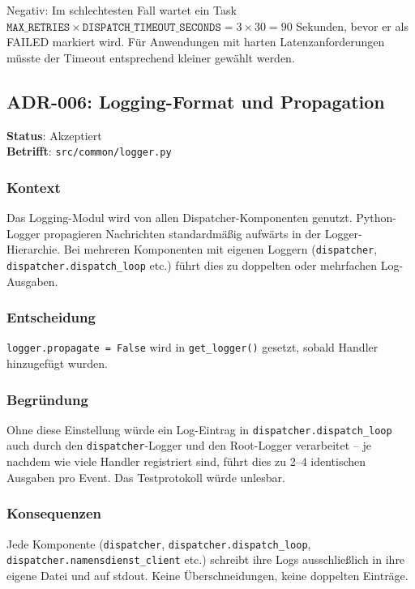 Negativ: Im schlechtesten Fall wartet ein Task
$\texttt{MAX\_RETRIES} \times \texttt{DISPATCH\_TIMEOUT\_SECONDS}
= 3 \times 30 = 90$ Sekunden, bevor er als FAILED markiert wird.
Für Anwendungen mit harten Latenzanforderungen müsste der Timeout
entsprechend kleiner gewählt werden.

\subsection{ADR-006: Logging-Format und Propagation}

\textbf{Status}: Akzeptiert \\
\textbf{Betrifft}: \texttt{src/common/logger.py}

\subsubsection*{Kontext}

Das Logging-Modul wird von allen Dispatcher-Komponenten genutzt.
Python-Logger propagieren Nachrichten standardmäßig aufwärts in der
Logger-Hierarchie. Bei mehreren Komponenten mit eigenen Loggern
(\texttt{dispatcher}, \texttt{dispatcher.dispatch\_loop} etc.) führt dies
zu doppelten oder mehrfachen Log-Ausgaben.

\subsubsection*{Entscheidung}

\texttt{logger.propagate = False} wird in \texttt{get\_logger()} gesetzt,
sobald Handler hinzugefügt wurden.

\subsubsection*{Begründung}

Ohne diese Einstellung würde ein Log-Eintrag in
\texttt{dispatcher.dispatch\_loop} auch durch den \texttt{dispatcher}-Logger
und den Root-Logger verarbeitet -- je nachdem wie viele Handler
registriert sind, führt dies zu 2--4 identischen Ausgaben pro Event.
Das Testprotokoll würde unlesbar.

\subsubsection*{Konsequenzen}

Jede Komponente (\texttt{dispatcher}, \texttt{dispatcher.dispatch\_loop},
\texttt{dispatcher.namensdienst\_client} etc.) schreibt ihre Logs
ausschließlich in ihre eigene Datei und auf stdout.
Keine Überschneidungen, keine doppelten Einträge.
